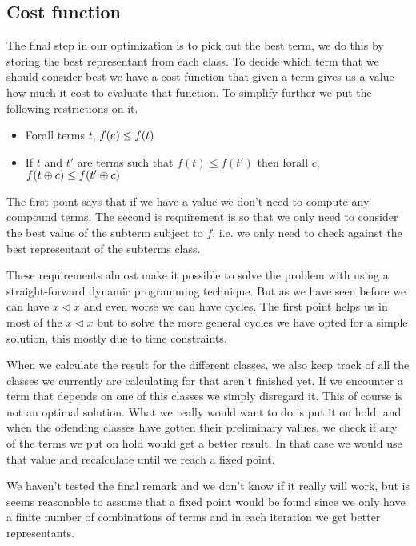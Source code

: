 \subsection{Cost function}
The final step in our optimization is to pick out the best term, we do this by
storing the best representant from each class. To decide which term that we should
consider best we have a cost function that given a term gives us a value how
much it cost to evaluate that function. To simplify further we put the following
restrictions on it.

\begin{itemize}
  \item Forall terms $t$, $f(e) \le f(t)$
  \item If $t$ and $t'$ are terms such that $f(t) \le f(t')$ then forall $c$,
         $f(t \oplus c) \le f(t' \oplus c)$
\end{itemize}

The first point says that if we have a value we don't need to compute any compound
terms. The second is requirement is so that we only need to consider the best value
 of the subterm subject to $f$, i.e. we only need to check against the
best representant of the subterms class.

These requirements almost make it possible to solve the problem with using a 
straight-forward dynamic programming technique. But as we have seen before we can
have $x \lhd x$ and even worse we can have cycles. The first point helps us in most
of the $x \lhd x$ but to solve the more general cycles we have opted for a simple 
solution, this mostly due to time constraints.

When we calculate the result for the different classes, we also keep track of all
the classes we currently are calculating for that aren't finished yet. If we encounter
a term that depends on one of this classes we simply disregard it. This of course
is not an optimal solution. What we really would want to do is put it on hold,
and when the offending classes have gotten their preliminary values, we check if
any of the terms we put on hold would get a better result. In that case we would use that value and recalculate until we reach a fixed point.

We haven't tested the final remark and we don't know if it really will work, but
is seems reasonable to assume that a fixed point would be found since we only have
a finite number of combinations of terms and in each iteration we get better representants.
